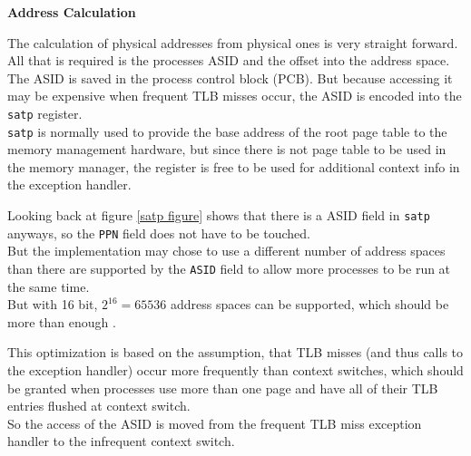 


\textbf{Address Calculation}

The calculation of physical addresses from physical ones is very straight forward. All that is required is the processes ASID and the offset into the address space.\\
The ASID is saved in the process control block (PCB). But because accessing it may be expensive when frequent TLB misses occur, the ASID is encoded into the \texttt{satp} register.\\
\texttt{satp} is normally used to provide the base address of the root page table to the memory management hardware, but since there is not page table to be used in the memory manager, the register is free to be used for additional context info in the exception handler.

Looking back at figure \ref{satp figure} shows that there is a ASID field in \texttt{satp} anyways,
so the \texttt{PPN} field does not have to be touched.\\
But the implementation may chose to use a different number of address spaces than there are supported by the \texttt{ASID} field to allow more processes to be run at the same time.\\
But with 16 bit, $2^16 = 65536$ address spaces can be supported, which should be more than enough .

This optimization is based on the assumption, that TLB misses (and thus calls to the exception handler) occur more frequently than context switches, which should be granted when processes use more than one page and have all of their TLB entries flushed at context switch.\\
So the access of the ASID is moved from the frequent TLB miss exception handler to the infrequent context switch. %





